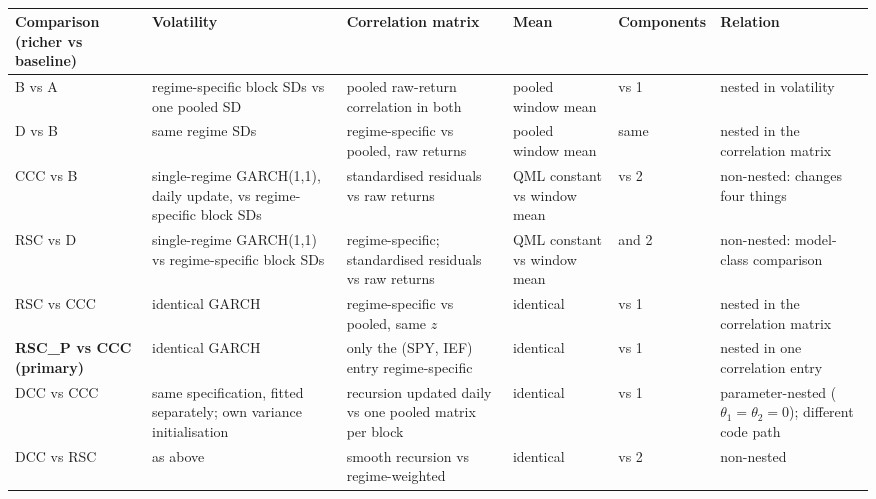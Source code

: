 \begin{table}[t]
\centering{}\footnotesize
\caption{}\label{tab:differs}
\renewcommand{\arraystretch}{1.15}
\begin{tabularx}{\textwidth}{@{}>{\raggedright\arraybackslash}p{2.0cm}>{\raggedright\arraybackslash}X>{\raggedright\arraybackslash}X>{\raggedright\arraybackslash}p{1.9cm}>{\raggedright\arraybackslash}p{1.75cm}>{\raggedright\arraybackslash}X@{}}
\toprule
Comparison (richer vs baseline) & Volatility & Correlation matrix & Mean & Components & Relation\\
\midrule
B vs A & regime-specific block SDs vs one pooled SD & pooled raw-return correlation in both & pooled window mean & 2 vs 1 & nested in volatility\\
\addlinespace
D vs B & same regime SDs & regime-specific vs pooled, raw returns & pooled window mean & same & nested in the correlation matrix\\
\addlinespace
CCC vs B & single-regime GARCH(1,1), daily update, vs regime-specific block SDs & standardised residuals vs raw returns & QML constant vs window mean & 1 vs 2 & non-nested: changes four things\\
\addlinespace
RSC vs D & single-regime GARCH(1,1) vs regime-specific block SDs & regime-specific; standardised residuals vs raw returns & QML constant vs window mean & 2 and 2 & non-nested: model-class comparison\\
\addlinespace
RSC vs CCC & identical GARCH & regime-specific vs pooled, same $z$ & identical & 2 vs 1 & nested in the correlation matrix\\
\addlinespace
\textbf{RSC\_P vs CCC (primary)} & identical GARCH & only the (SPY, IEF) entry regime-specific & identical & 2 vs 1 & nested in one correlation entry\\
\addlinespace
DCC vs CCC & same specification, fitted separately; own variance initialisation & recursion updated daily vs one pooled matrix per block & identical & 1 vs 1 & parameter-nested ($\theta_1=\theta_2=0$); different code path\\
\addlinespace
DCC vs RSC & as above & smooth recursion vs regime-weighted & identical & 1 vs 2 & non-nested\\
\bottomrule
\end{tabularx}
\end{table}

